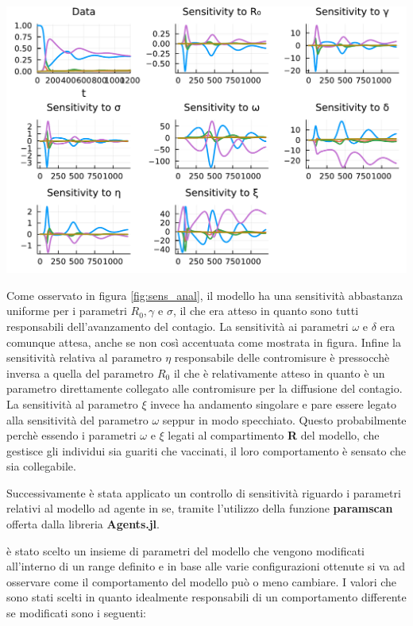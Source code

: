 \begin{minipage}{\linewidth}
	\centering
	\includegraphics[width=\textwidth]{img/sa.pdf}
	\label{fig:sens_anal}
\end{minipage}

Come osservato in figura \ref{fig:sens_anal}, il modello ha una sensitività abbastanza 
uniforme per i parametri $R_0, \gamma$ e $\sigma$, il che era atteso in quanto sono tutti 
responsabili dell'avanzamento del contagio. La sensitività ai parametri $\omega$ e $\delta$ 
era comunque attesa, anche se non così accentuata come mostrata in figura. Infine la sensitività 
relativa al parametro $\eta$ responsabile delle contromisure è pressocchè inversa a quella del 
parametro $R_0$ il che è relativamente atteso in quanto è un parametro direttamente collegato 
alle contromisure per la diffusione del contagio. La sensitività al parametro $\xi$ invece ha 
andamento singolare e pare essere legato alla sensitività del parametro $\omega$ seppur in 
modo specchiato. Questo probabilmente perchè essendo i parametri $\omega$ e $\xi$ legati al 
compartimento \textbf{R} del modello, che gestisce gli individui sia guariti che vaccinati, 
il loro comportamento è sensato che sia collegabile.

Successivamente è stata applicato un controllo di sensitività riguardo i parametri 
relativi al modello ad agente in se, tramite l'utilizzo della funzione \textbf{paramscan} offerta
dalla libreria \textbf{Agents.jl}.

è stato scelto un insieme di parametri del modello che vengono modificati all'interno di un range 
definito e in base alle varie configurazioni ottenute si va ad osservare come il comportamento del modello 
può o meno cambiare. I valori che sono stati scelti in quanto idealmente responsabili di un comportamento 
differente se modificati sono i seguenti: 

